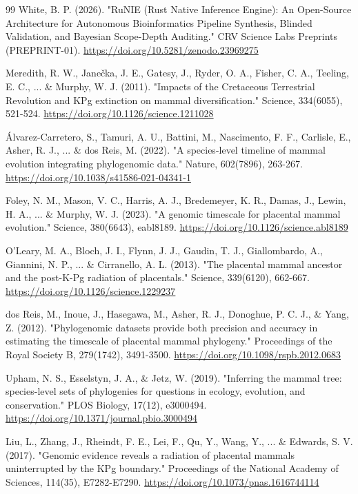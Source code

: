 \documentclass[10pt,letterpaper]{article}
\begin{document}
\begin{thebibliography}{99}
 White, B. P. (2026). "RuNIE (Rust Native Inference Engine): An Open-Source Architecture for Autonomous Bioinformatics Pipeline Synthesis, Blinded Validation, and Bayesian Scope-Depth Auditing." CRV Science Labs Preprints (PREPRINT-01). \url{https://doi.org/10.5281/zenodo.23969275}

 Meredith, R. W., Janečka, J. E., Gatesy, J., Ryder, O. A., Fisher, C. A., Teeling, E. C., ... \& Murphy, W. J. (2011). "Impacts of the Cretaceous Terrestrial Revolution and KPg extinction on mammal diversification." Science, 334(6055), 521-524. \url{https://doi.org/10.1126/science.1211028}

 Álvarez-Carretero, S., Tamuri, A. U., Battini, M., Nascimento, F. F., Carlisle, E., Asher, R. J., ... \& dos Reis, M. (2022). "A species-level timeline of mammal evolution integrating phylogenomic data." Nature, 602(7896), 263-267. \url{https://doi.org/10.1038/s41586-021-04341-1}

 Foley, N. M., Mason, V. C., Harris, A. J., Bredemeyer, K. R., Damas, J., Lewin, H. A., ... \& Murphy, W. J. (2023). "A genomic timescale for placental mammal evolution." Science, 380(6643), eabl8189. \url{https://doi.org/10.1126/science.abl8189}

 O'Leary, M. A., Bloch, J. I., Flynn, J. J., Gaudin, T. J., Giallombardo, A., Giannini, N. P., ... \& Cirranello, A. L. (2013). "The placental mammal ancestor and the post-K-Pg radiation of placentals." Science, 339(6120), 662-667. \url{https://doi.org/10.1126/science.1229237}

 dos Reis, M., Inoue, J., Hasegawa, M., Asher, R. J., Donoghue, P. C. J., \& Yang, Z. (2012). "Phylogenomic datasets provide both precision and accuracy in estimating the timescale of placental mammal phylogeny." Proceedings of the Royal Society B, 279(1742), 3491-3500. \url{https://doi.org/10.1098/rspb.2012.0683}

 Upham, N. S., Esselstyn, J. A., \& Jetz, W. (2019). "Inferring the mammal tree: species-level sets of phylogenies for questions in ecology, evolution, and conservation." PLOS Biology, 17(12), e3000494. \url{https://doi.org/10.1371/journal.pbio.3000494}

 Liu, L., Zhang, J., Rheindt, F. E., Lei, F., Qu, Y., Wang, Y., ... \& Edwards, S. V. (2017). "Genomic evidence reveals a radiation of placental mammals uninterrupted by the KPg boundary." Proceedings of the National Academy of Sciences, 114(35), E7282-E7290. \url{https://doi.org/10.1073/pnas.1616744114}


\end{thebibliography}
\end{document}
